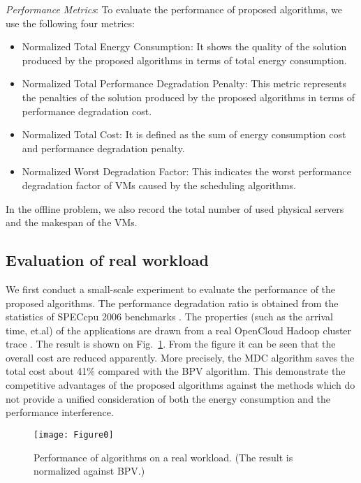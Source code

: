 \documentclass[10pt,journal]{IEEEtran}
\begin{document}
\textit{Performance Metrics}: To evaluate the performance of proposed algorithms, we use the following four metrics:
\begin{itemize}
\item Normalized Total Energy Consumption: It shows the quality of the solution produced by the proposed algorithms in terms of total energy consumption.
\item Normalized Total Performance Degradation Penalty: This metric represents the penalties of the solution produced by the proposed algorithms in terms of performance degradation cost.
\item Normalized Total Cost: It is defined as the sum of energy consumption cost and performance degradation penalty.
\item Normalized Worst Degradation Factor: This indicates the worst performance degradation factor of VMs caused by the scheduling algorithms.
\end{itemize}

In the offline problem, we also record the total number of used physical servers and the makespan of the VMs.

\subsection{Evaluation of real workload}
We first conduct a small-scale experiment to evaluate the performance of the proposed algorithms. The performance degradation ratio is obtained from the statistics of SPECcpu 2006 benchmarks \cite{Kim13}. The properties (such as the arrival time, et.al) of the applications are drawn from a real OpenCloud Hadoop cluster trace \cite{Ren13}. The result is shown on Fig.~\ref{fig:eva_real_workload}. From the figure it can be seen that the overall cost are reduced apparently. More precisely, the MDC algorithm saves the total cost about 41\% compared with the BPV algorithm. This demonstrate the competitive advantages of the proposed algorithms against the methods which do not provide a unified consideration of both the energy consumption and the performance interference.
\begin{figure}[htbp]
\centering
\texttt{[image: Figure0]}
\centering
\caption{\label{fig:eva_real_workload} Performance of algorithms on a real workload. (The result is normalized against BPV.)}
\end{figure}
\end{document}
